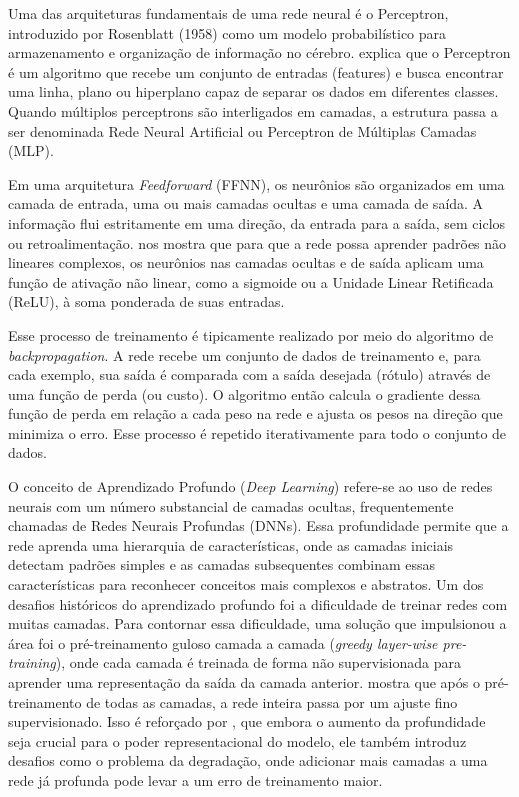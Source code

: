 Uma das arquiteturas fundamentais de uma rede neural é o Perceptron, introduzido por Rosenblatt (1958) como um modelo probabilístico para armazenamento e organização de informação no cérebro.  explica que o Perceptron é um algoritmo que recebe um conjunto de entradas (features) e busca encontrar uma linha, plano ou hiperplano capaz de separar os dados em diferentes classes. Quando múltiplos perceptrons são interligados em camadas, a estrutura passa a ser denominada Rede Neural Artificial ou Perceptron de Múltiplas Camadas (MLP).

Em uma arquitetura \textit{Feedforward} (FFNN), os neurônios são organizados em uma camada de entrada, uma ou mais camadas ocultas e uma camada de saída. A informação flui estritamente em uma direção, da entrada para a saída, sem ciclos ou retroalimentação. nos mostra que para que a rede possa aprender padrões não lineares complexos, os neurônios nas camadas ocultas e de saída aplicam uma função de ativação não linear, como a sigmoide ou a Unidade Linear Retificada (ReLU), à soma ponderada de suas entradas.

Esse processo de treinamento é tipicamente realizado por meio do algoritmo de \textit{backpropagation}. A rede recebe um conjunto de dados de treinamento e, para cada exemplo, sua saída é comparada com a saída desejada (rótulo) através de uma função de perda (ou custo). O algoritmo então calcula o gradiente dessa função de perda em relação a cada peso na rede e ajusta os pesos na direção que minimiza o erro. Esse processo é repetido iterativamente para todo o conjunto de dados.

O conceito de Aprendizado Profundo (\textit{Deep Learning}) refere-se ao uso de redes neurais com um número substancial de camadas ocultas, frequentemente chamadas de Redes Neurais Profundas (DNNs). Essa profundidade permite que a rede aprenda uma hierarquia de características, onde as camadas iniciais detectam padrões simples e as camadas subsequentes combinam essas características para reconhecer conceitos mais complexos e abstratos. Um dos desafios históricos do aprendizado profundo foi a dificuldade de treinar redes com muitas camadas. Para contornar essa dificuldade, uma solução que impulsionou a área foi o pré-treinamento guloso camada a camada (\textit{greedy layer-wise pre-training}), onde cada camada é treinada de forma não supervisionada para aprender uma representação da saída da camada anterior. mostra que após o pré-treinamento de todas as camadas, a rede inteira passa por um ajuste fino supervisionado. Isso é reforçado por , que embora o aumento da profundidade seja crucial para o poder representacional do modelo, ele também introduz desafios como o problema da degradação, onde adicionar mais camadas a uma rede já profunda pode levar a um erro de treinamento maior.

